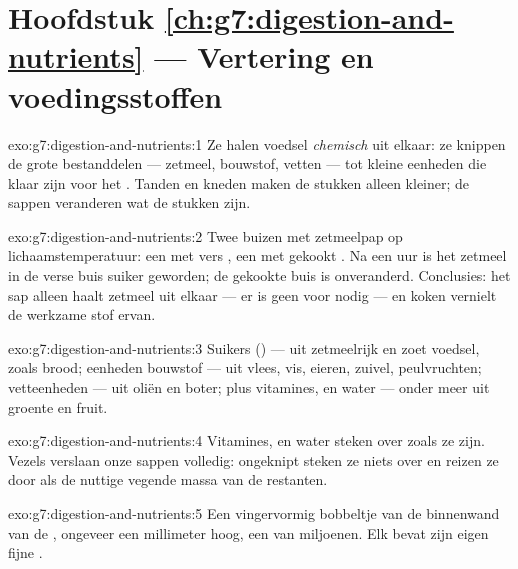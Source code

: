 \section*{Hoofdstuk \ref{ch:g7:digestion-and-nutrients} --- Vertering en voedingsstoffen}

\begin{solution}{exo:g7:digestion-and-nutrients:1}
Ze halen voedsel \emph{chemisch} uit elkaar: ze knippen de grote
bestanddelen --- zetmeel, bouwstof, vetten --- tot kleine eenheden die
klaar zijn voor het . Tanden en kneden maken de stukken alleen
kleiner; de sappen veranderen wat de stukken zijn.
\end{solution}

\begin{solution}{exo:g7:digestion-and-nutrients:2}
Twee buizen met zetmeelpap op lichaamstemperatuur: een met vers ,
een met gekookt . Na een uur is het zetmeel in de verse buis
suiker geworden; de gekookte buis is onveranderd. Conclusies: het sap
alleen haalt zetmeel uit elkaar --- er is geen  voor nodig --- en
koken vernielt de werkzame stof ervan.
\end{solution}

\begin{solution}{exo:g7:digestion-and-nutrients:3}
Suikers () --- uit zetmeelrijk en zoet voedsel, zoals brood;
eenheden bouwstof --- uit vlees, vis, eieren, zuivel, peulvruchten;
vetteenheden --- uit oliën en boter; plus vitamines,  en
water --- onder meer uit groente en fruit.
\end{solution}

\begin{solution}{exo:g7:digestion-and-nutrients:4}
Vitamines,  en water steken over zoals ze zijn. Vezels
verslaan onze sappen volledig: ongeknipt steken ze niets over en reizen ze
door als de nuttige vegende massa van de restanten.
\end{solution}

\begin{solution}{exo:g7:digestion-and-nutrients:5}
Een vingervormig bobbeltje van de binnenwand van de , ongeveer
een millimeter hoog, een van miljoenen. Elk bevat zijn eigen fijne
.
\end{solution}

